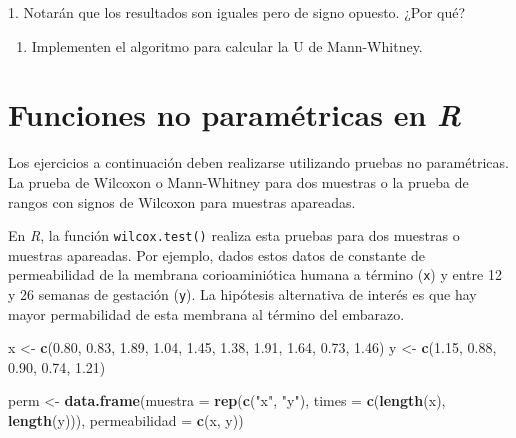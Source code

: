 \documentclass[]{book}
\newenvironment{Shaded}{\begin{snugshade}}{\end{snugshade}}
\newcommand{\DataTypeTok}[1]{\textcolor[rgb]{0.13,0.29,0.53}{#1}}
\newcommand{\FloatTok}[1]{\textcolor[rgb]{0.00,0.00,0.81}{#1}}
\newcommand{\KeywordTok}[1]{\textcolor[rgb]{0.13,0.29,0.53}{\textbf{#1}}}
\newcommand{\NormalTok}[1]{#1}
\newcommand{\StringTok}[1]{\textcolor[rgb]{0.31,0.60,0.02}{#1}}
\providecommand{\tightlist}{%
  \setlength{\itemsep}{0pt}\setlength{\parskip}{0pt}}
\theoremstyle{definition}
\theoremstyle{definition}
\theoremstyle{definition}
\theoremstyle{remark}
\let\BeginKnitrBlock\begin \let\EndKnitrBlock\end
\begin{document}
\BeginKnitrBlock{exercise}
\protect\hypertarget{exr:unnamed-chunk-8}{}{\label{exr:unnamed-chunk-8} }1.
Notarán que los resultados son iguales pero de signo opuesto. ¿Por qué?

\begin{enumerate}
\def\labelenumi{\arabic{enumi}.}
\setcounter{enumi}{1}
\tightlist
\item
  Implementen el algoritmo para calcular la U de Mann-Whitney.
\end{enumerate}
\EndKnitrBlock{exercise}

\hypertarget{funciones-no-parametricas-en-r}{%
\section{\texorpdfstring{Funciones no paramétricas en
\emph{R}}{Funciones no paramétricas en R}}\label{funciones-no-parametricas-en-r}}

Los ejercicios a continuación deben realizarse utilizando pruebas no
paramétricas. La prueba de Wilcoxon o Mann-Whitney para dos muestras o
la prueba de rangos con signos de Wilcoxon para muestras apareadas.

En \emph{R}, la función \texttt{wilcox.test()} realiza esta pruebas para
dos muestras o muestras apareadas. Por ejemplo, dados estos datos de
constante de permeabilidad de la membrana corioaminiótica humana a
término (\texttt{x}) y entre 12 y 26 semanas de gestación (\texttt{y}).
La hipótesis alternativa de interés es que hay mayor permabilidad de
esta membrana al término del embarazo.

\begin{Shaded}
\begin{Highlighting}[]
\NormalTok{x <-}\StringTok{ }\KeywordTok{c}\NormalTok{(}\FloatTok{0.80}\NormalTok{, }\FloatTok{0.83}\NormalTok{, }\FloatTok{1.89}\NormalTok{, }\FloatTok{1.04}\NormalTok{, }\FloatTok{1.45}\NormalTok{, }\FloatTok{1.38}\NormalTok{, }\FloatTok{1.91}\NormalTok{, }\FloatTok{1.64}\NormalTok{, }\FloatTok{0.73}\NormalTok{, }\FloatTok{1.46}\NormalTok{)}
\NormalTok{y <-}\StringTok{ }\KeywordTok{c}\NormalTok{(}\FloatTok{1.15}\NormalTok{, }\FloatTok{0.88}\NormalTok{, }\FloatTok{0.90}\NormalTok{, }\FloatTok{0.74}\NormalTok{, }\FloatTok{1.21}\NormalTok{)}

\NormalTok{perm <-}\StringTok{ }\KeywordTok{data.frame}\NormalTok{(}\DataTypeTok{muestra =} \KeywordTok{rep}\NormalTok{(}\KeywordTok{c}\NormalTok{(}\StringTok{"x"}\NormalTok{, }\StringTok{"y"}\NormalTok{), }\DataTypeTok{times =} \KeywordTok{c}\NormalTok{(}\KeywordTok{length}\NormalTok{(x), }\KeywordTok{length}\NormalTok{(y))),}
           \DataTypeTok{permeabilidad =} \KeywordTok{c}\NormalTok{(x, y))}
\end{Highlighting}
\end{Shaded}
\end{document}
